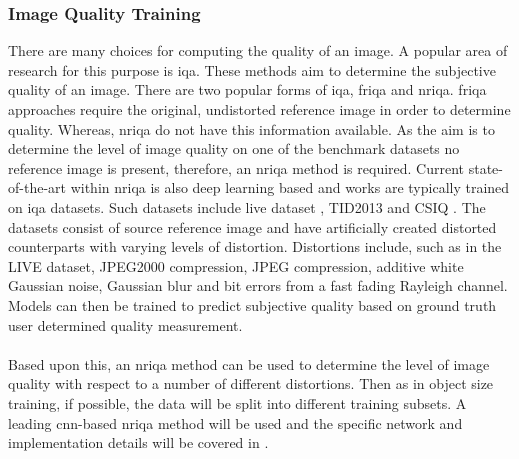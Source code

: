 \subsubsection{Image Quality Training}
There are many choices for computing the quality of an image. A popular area of research for this purpose is \gls{iqa}. These methods aim to determine the subjective quality of an image. There are two popular forms of \gls{iqa}, \gls{friqa} and \gls{nriqa}. \gls{friqa} approaches require the original, undistorted reference image in order to determine quality. Whereas, \gls{nriqa} do not have this information available. As the aim is to determine the level of image quality on one of the benchmark datasets no reference image is present, therefore, an \gls{nriqa} method is required. Current state-of-the-art within \gls{nriqa} is also deep learning based and works are typically trained on \gls{iqa} datasets. Such datasets include \gls{live} dataset \cite{livepaper} \cite{liveweb}, TID2013 \cite{tid2013} and CSIQ \cite{csiq}. The datasets consist of source reference image and have artificially created distorted counterparts with varying levels of distortion. Distortions include, such as in the LIVE dataset, JPEG2000 compression, JPEG compression, additive white Gaussian noise, Gaussian blur and bit errors from a fast fading Rayleigh channel. Models can then be trained to predict subjective quality based on ground truth user determined quality measurement.
\\\\
Based upon this, an \gls{nriqa} method can be used to determine the level of image quality with respect to a number of different distortions. Then as in object size training, if possible, the data will be split into different training subsets. A leading \gls{cnn}-based \gls{nriqa} method will be used and the specific network and implementation details will be covered in .
